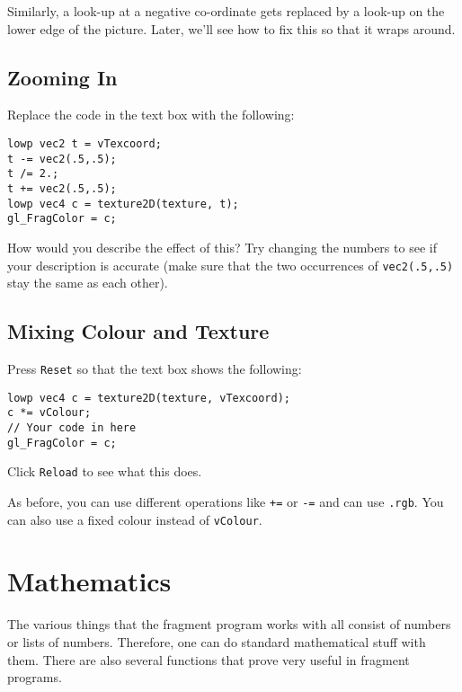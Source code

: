 \documentclass[
  html5,%
  mathml,%
  use filename%
]{internet}
\makeatletter
\let\prev@sec=\section
\renewcommand\section{\clearpage\prev@sec}
\makeatother
\begin{document}
Similarly, a look-up at a negative co-ordinate gets replaced by a look-up on the lower edge of the picture.
Later, we'll see how to fix this so that it wraps around.

\subsection{Zooming In}

Replace the code in the text box with the following:

\begin{tcolorbox}
\begin{verbatim}
lowp vec2 t = vTexcoord;
t -= vec2(.5,.5);
t /= 2.;
t += vec2(.5,.5);
lowp vec4 c = texture2D(texture, t);
gl_FragColor = c;
\end{verbatim}
\end{tcolorbox}

How would you describe the effect of this?
Try changing the numbers to see if your description is accurate (make sure that the two occurrences of \verb+vec2(.5,.5)+ stay the same as each other).

\subsection{Mixing Colour and Texture}

Press \verb+Reset+ so that the text box shows the following:

\begin{tcolorbox}
\begin{verbatim}
lowp vec4 c = texture2D(texture, vTexcoord);
c *= vColour;
// Your code in here
gl_FragColor = c;
\end{verbatim}
\end{tcolorbox}

Click \verb+Reload+ to see what this does.

As before, you can use different operations like \verb!+=! or \verb!-=! and can use \verb!.rgb!.
You can also use a fixed colour instead of \verb!vColour!.


\section{Mathematics}

The various things that the fragment program works with all consist of numbers or lists of numbers.
Therefore, one can do standard mathematical stuff with them.
There are also several functions that prove very useful in fragment programs.
\end{document}
